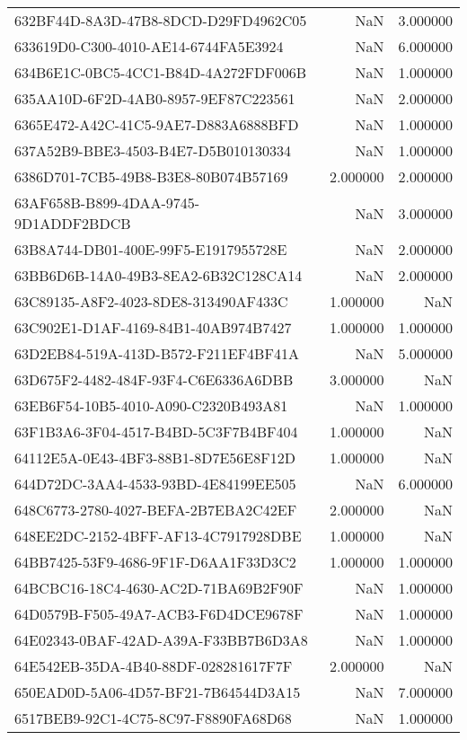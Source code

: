 \begin{tabular}{lrr}
632BF44D-8A3D-47B8-8DCD-D29FD4962C05 & NaN & 3.000000 \\
633619D0-C300-4010-AE14-6744FA5E3924 & NaN & 6.000000 \\
634B6E1C-0BC5-4CC1-B84D-4A272FDF006B & NaN & 1.000000 \\
635AA10D-6F2D-4AB0-8957-9EF87C223561 & NaN & 2.000000 \\
6365E472-A42C-41C5-9AE7-D883A6888BFD & NaN & 1.000000 \\
637A52B9-BBE3-4503-B4E7-D5B010130334 & NaN & 1.000000 \\
6386D701-7CB5-49B8-B3E8-80B074B57169 & 2.000000 & 2.000000 \\
63AF658B-B899-4DAA-9745-9D1ADDF2BDCB & NaN & 3.000000 \\
63B8A744-DB01-400E-99F5-E1917955728E & NaN & 2.000000 \\
63BB6D6B-14A0-49B3-8EA2-6B32C128CA14 & NaN & 2.000000 \\
63C89135-A8F2-4023-8DE8-313490AF433C & 1.000000 & NaN \\
63C902E1-D1AF-4169-84B1-40AB974B7427 & 1.000000 & 1.000000 \\
63D2EB84-519A-413D-B572-F211EF4BF41A & NaN & 5.000000 \\
63D675F2-4482-484F-93F4-C6E6336A6DBB & 3.000000 & NaN \\
63EB6F54-10B5-4010-A090-C2320B493A81 & NaN & 1.000000 \\
63F1B3A6-3F04-4517-B4BD-5C3F7B4BF404 & 1.000000 & NaN \\
64112E5A-0E43-4BF3-88B1-8D7E56E8F12D & 1.000000 & NaN \\
644D72DC-3AA4-4533-93BD-4E84199EE505 & NaN & 6.000000 \\
648C6773-2780-4027-BEFA-2B7EBA2C42EF & 2.000000 & NaN \\
648EE2DC-2152-4BFF-AF13-4C7917928DBE & 1.000000 & NaN \\
64BB7425-53F9-4686-9F1F-D6AA1F33D3C2 & 1.000000 & 1.000000 \\
64BCBC16-18C4-4630-AC2D-71BA69B2F90F & NaN & 1.000000 \\
64D0579B-F505-49A7-ACB3-F6D4DCE9678F & NaN & 1.000000 \\
64E02343-0BAF-42AD-A39A-F33BB7B6D3A8 & NaN & 1.000000 \\
64E542EB-35DA-4B40-88DF-028281617F7F & 2.000000 & NaN \\
650EAD0D-5A06-4D57-BF21-7B64544D3A15 & NaN & 7.000000 \\
6517BEB9-92C1-4C75-8C97-F8890FA68D68 & NaN & 1.000000 \\

\end{tabular}
